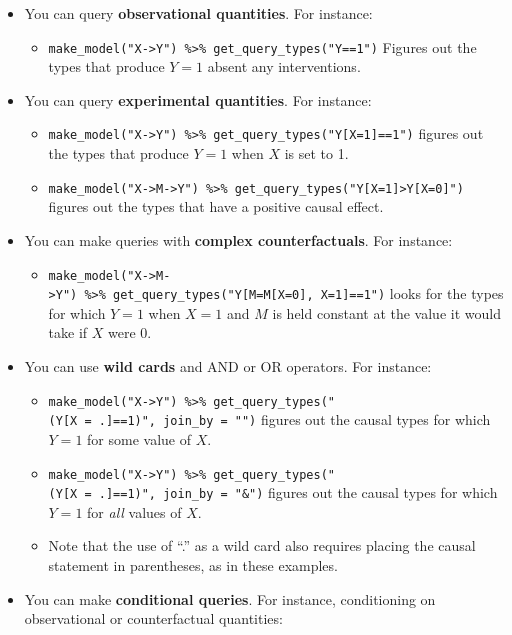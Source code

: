 \documentclass[
  12pt,
]{book}
\providecommand{\tightlist}{%
  \setlength{\itemsep}{0pt}\setlength{\parskip}{0pt}}
\begin{document}
\begin{itemize}
\tightlist
\item
  You can query \textbf{observational quantities}. For instance:

  \begin{itemize}
  \tightlist
  \item
    \texttt{make\_model("X-\textgreater{}Y")\ \%\textgreater{}\%\ get\_query\_types("Y==1")} Figures out the types that produce \(Y=1\) absent any interventions.
  \end{itemize}
\item
  You can query \textbf{experimental quantities}. For instance:

  \begin{itemize}
  \tightlist
  \item
    \texttt{make\_model("X-\textgreater{}Y")\ \%\textgreater{}\%\ get\_query\_types("Y{[}X=1{]}==1")} figures out the types that produce \(Y=1\) when \(X\) is set to 1.
  \item
    \texttt{make\_model("X-\textgreater{}M-\textgreater{}Y")\ \%\textgreater{}\%\ get\_query\_types("Y{[}X=1{]}\textgreater{}Y{[}X=0{]}")} figures out the types that have a positive causal effect.
  \end{itemize}
\item
  You can make queries with \textbf{complex counterfactuals}. For instance:

  \begin{itemize}
  \tightlist
  \item
    \texttt{make\_model("X-\textgreater{}M-\textgreater{}Y")\ \%\textgreater{}\%\ get\_query\_types("Y{[}M=M{[}X=0{]},\ X=1{]}==1")} looks for the types for which \(Y=1\) when \(X=1\) and \(M\) is held constant at the value it would take if \(X\) were 0.
  \end{itemize}
\item
  You can use \textbf{wild cards} and AND or OR operators. For instance:

  \begin{itemize}
  \tightlist
  \item
    \texttt{make\_model("X-\textgreater{}Y")\ \%\textgreater{}\%\ get\_query\_types("(Y{[}X\ =\ .{]}==1)",\ join\_by\ =\ "\textbar{}")} figures out the causal types for which \(Y=1\) for some value of \(X\).
  \item
    \texttt{make\_model("X-\textgreater{}Y")\ \%\textgreater{}\%\ get\_query\_types("(Y{[}X\ =\ .{]}==1)",\ join\_by\ =\ "\&")} figures out the causal types for which \(Y=1\) for \emph{all} values of \(X\).
  \item
    Note that the use of ``.'' as a wild card also requires placing the causal statement in parentheses, as in these examples.
  \end{itemize}
\item
  You can make \textbf{conditional queries}. For instance, conditioning on observational or counterfactual quantities:


\end{itemize}
\end{document}
